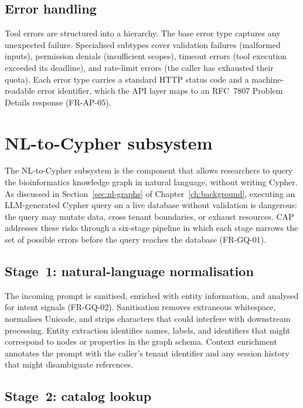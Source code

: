 \documentclass[a4paper,noexaminfo]{sapthesis}
\begin{document}
\subsection{Error handling}

Tool errors are structured into a hierarchy.  The base error type captures
any unexpected failure.  Specialised subtypes cover validation failures
(malformed inputs), permission denials (insufficient scopes), timeout
errors (tool execution exceeded its deadline), and rate-limit errors (the
caller has exhausted their quota).  Each error type carries a standard HTTP
status code and a machine-readable error identifier, which the API layer
maps to an RFC~7807 Problem Details response (FR-AP-05).


\section{NL-to-Cypher subsystem}
\label{sec:nl-cypher}

The NL-to-Cypher subsystem is the component that allows researchers to
query the bioinformatics knowledge graph in natural language, without
writing Cypher.  As discussed in Section~\ref{sec:nl-graphs} of
Chapter~\ref{ch:background}, executing an LLM-generated Cypher query on a
live database without validation is dangerous: the query may mutate data,
cross tenant boundaries, or exhaust resources.  CAP addresses these risks
through a six-stage pipeline in which each stage narrows the set of
possible errors before the query reaches the database (FR-GQ-01).

\subsection{Stage~1: natural-language normalisation}

The incoming prompt is sanitised, enriched with entity information, and
analysed for intent signals (FR-GQ-02).  Sanitisation removes extraneous
whitespace, normalises Unicode, and strips characters that could interfere
with downstream processing.  Entity extraction identifies names, labels,
and identifiers that might correspond to nodes or properties in the graph
schema.  Context enrichment annotates the prompt with the caller's tenant
identifier and any session history that might disambiguate references.

\subsection{Stage~2: catalog lookup}
\end{document}
